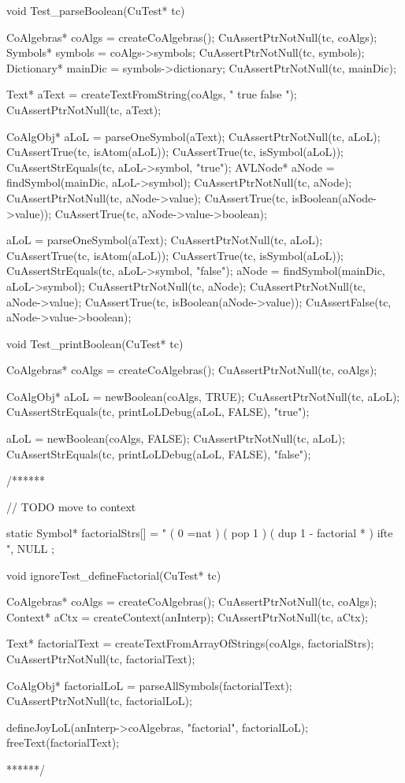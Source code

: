 void Test_parseBoolean(CuTest* tc) {
  CoAlgebras* coAlgs = createCoAlgebras();
  CuAssertPtrNotNull(tc, coAlgs);
  Symbols* symbols = coAlgs->symbols;
  CuAssertPtrNotNull(tc, symbols);
  Dictionary* mainDic = symbols->dictionary;
  CuAssertPtrNotNull(tc, mainDic);

  Text* aText = createTextFromString(coAlgs, " true false ");
  CuAssertPtrNotNull(tc, aText);

  CoAlgObj* aLoL = parseOneSymbol(aText);
  CuAssertPtrNotNull(tc, aLoL);
  CuAssertTrue(tc, isAtom(aLoL));
  CuAssertTrue(tc, isSymbol(aLoL));
  CuAssertStrEquals(tc, aLoL->symbol, "true");
  AVLNode* aNode = findSymbol(mainDic, aLoL->symbol);
  CuAssertPtrNotNull(tc, aNode);
  CuAssertPtrNotNull(tc, aNode->value);
  CuAssertTrue(tc, isBoolean(aNode->value));
  CuAssertTrue(tc, aNode->value->boolean);

  aLoL = parseOneSymbol(aText);
  CuAssertPtrNotNull(tc, aLoL);
  CuAssertTrue(tc, isAtom(aLoL));
  CuAssertTrue(tc, isSymbol(aLoL));
  CuAssertStrEquals(tc, aLoL->symbol, "false");
  aNode = findSymbol(mainDic, aLoL->symbol);
  CuAssertPtrNotNull(tc, aNode);
  CuAssertPtrNotNull(tc, aNode->value);
  CuAssertTrue(tc, isBoolean(aNode->value));
  CuAssertFalse(tc, aNode->value->boolean);
}

void Test_printBoolean(CuTest* tc) {
  CoAlgebras* coAlgs = createCoAlgebras();
  CuAssertPtrNotNull(tc, coAlgs);

  CoAlgObj* aLoL = newBoolean(coAlgs, TRUE);
  CuAssertPtrNotNull(tc, aLoL);
  CuAssertStrEquals(tc, printLoLDebug(aLoL, FALSE), "true");

  aLoL = newBoolean(coAlgs, FALSE);
  CuAssertPtrNotNull(tc, aLoL);
  CuAssertStrEquals(tc, printLoLDebug(aLoL, FALSE), "false");
}

/******

// TODO move to context

static Symbol* factorialStrs[] = {
  " ( 0 =nat ) ( pop 1 ) ( dup 1 - factorial * ) ifte ",
  NULL
};

void ignoreTest_defineFactorial(CuTest* tc) {
  CoAlgebras* coAlgs = createCoAlgebras();
  CuAssertPtrNotNull(tc, coAlgs);
  Context* aCtx = createContext(anInterp);
  CuAssertPtrNotNull(tc, aCtx);

  Text* factorialText = createTextFromArrayOfStrings(coAlgs, factorialStrs);
  CuAssertPtrNotNull(tc, factorialText);

  CoAlgObj* factorialLoL = parseAllSymbols(factorialText);
  CuAssertPtrNotNull(tc, factorialLoL);

  defineJoyLoL(anInterp->coAlgebras, "factorial", factorialLoL);
  freeText(factorialText);
}
******/

